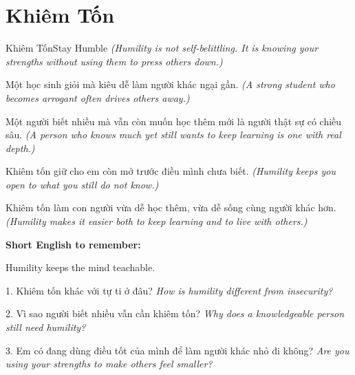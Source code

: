 \section{Khiêm Tốn}
\begin{truyen}{Khiêm Tốn}{Stay Humble}
\textit{(Humility is not self-belittling. It is knowing your strengths without using them to press others down.)}

Một học sinh giỏi mà kiêu dễ làm người khác ngại gần.
\textit{(A strong student who becomes arrogant often drives others away.)}

Một người biết nhiều mà vẫn còn muốn học thêm mới là người thật sự có chiều sâu.
\textit{(A person who knows much yet still wants to keep learning is one with real depth.)}

Khiêm tốn giữ cho em còn mở trước điều mình chưa biết.
\textit{(Humility keeps you open to what you still do not know.)}
\end{truyen}

\begin{baihoc}
Khiêm tốn làm con người vừa dễ học thêm, vừa dễ sống cùng người khác hơn.
\textit{(Humility makes it easier both to keep learning and to live with others.)}
\end{baihoc}

\begin{ghinhoanh}
\textbf{Short English to remember:}

Humility keeps the mind teachable.

\end{ghinhoanh}

\begin{tuhocnhanh}
1. Khiêm tốn khác với tự ti ở đâu? \textit{How is humility different from insecurity?}

2. Vì sao người biết nhiều vẫn cần khiêm tốn? \textit{Why does a knowledgeable person still need humility?}

3. Em có đang dùng điều tốt của mình để làm người khác nhỏ đi không? \textit{Are you using your strengths to make others feel smaller?}
\end{tuhocnhanh}
\ngancach
